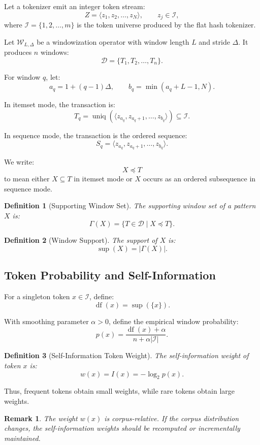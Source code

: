 \documentclass[11pt,a4paper]{article}
\newtheorem{definition}{Definition}
\newtheorem{remark}{Remark}
\newcommand{\D}{\mathcal{D}}
\newcommand{\I}{\mathcal{I}}
\newcommand{\supp}{\operatorname{sup}}
\newcommand{\df}{\operatorname{df}}
\newcommand{\uniq}{\operatorname{uniq}}
\begin{document}
Let a tokenizer emit an integer token stream:
\[
Z=\langle z_1,z_2,\dots,z_N\rangle,
\qquad
z_j\in\I,
\]
where \(\I=\{1,2,\dots,m\}\) is the token universe produced by the flat hash tokenizer.

Let \(\mathcal{W}_{L,\Delta}\) be a windowization operator with window length \(L\) and stride \(\Delta\). It produces \(n\) windows:
\[
\D=\{T_1,T_2,\dots,T_n\}.
\]

For window \(q\), let:
\[
a_q=1+(q-1)\Delta,
\qquad
b_q=\min(a_q+L-1,N).
\]

In itemset mode, the transaction is:
\[
T_q=\uniq(\langle z_{a_q},z_{a_q+1},\dots,z_{b_q}\rangle)\subseteq\I.
\]

In sequence mode, the transaction is the ordered sequence:
\[
S_q=\langle z_{a_q},z_{a_q+1},\dots,z_{b_q}\rangle.
\]

We write:
\[
X\preceq T
\]
to mean either \(X\subseteq T\) in itemset mode or \(X\) occurs as an ordered subsequence in sequence mode.

\begin{definition}[Supporting Window Set]
The supporting window set of a pattern \(X\) is:
\[
\Gamma(X)=\{T\in\D\mid X\preceq T\}.
\]
\end{definition}

\begin{definition}[Window Support]
The support of \(X\) is:
\[
\supp(X)=|\Gamma(X)|.
\]
\end{definition}

\subsection{Token Probability and Self-Information}

For a singleton token \(x\in\I\), define:
\[
\df(x)=\supp(\{x\}).
\]

With smoothing parameter \(\alpha>0\), define the empirical window probability:
\[
p(x)=\frac{\df(x)+\alpha}{n+\alpha|\I|}.
\]

\begin{definition}[Self-Information Token Weight]
The self-information weight of token \(x\) is:
\[
w(x)=I(x)=-\log_2 p(x).
\]
\end{definition}

Thus, frequent tokens obtain small weights, while rare tokens obtain large weights.

\begin{remark}
The weight \(w(x)\) is corpus-relative. If the corpus distribution changes, the self-information weights should be recomputed or incrementally maintained.
\end{remark}
\end{document}
